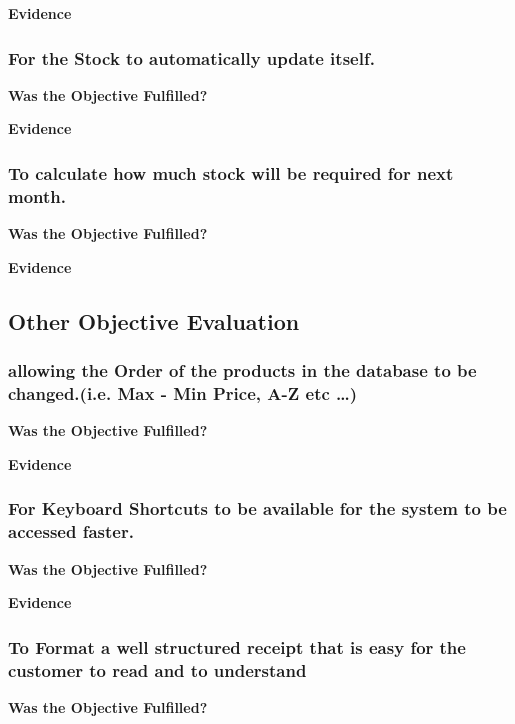 \textbf{Evidence} \newline



\subsubsection{For the Stock to automatically update itself.}
\textbf{Was the Objective Fulfilled?} \newline

\textbf{Evidence} \newline




\subsubsection{To calculate how much stock will be required for next month.}
\textbf{Was the Objective Fulfilled?} \newline

\textbf{Evidence} \newline



\subsection{Other Objective Evaluation}


\subsubsection{allowing the Order of the products in the database to be changed.(i.e. Max - Min Price, A-Z etc \ldots)}
\textbf{Was the Objective Fulfilled?} \newline

\textbf{Evidence} \newline



\subsubsection{For Keyboard Shortcuts to be available for the system to be accessed faster.}
\textbf{Was the Objective Fulfilled?} \newline

\textbf{Evidence} \newline



\subsubsection{To Format a well structured receipt that is easy for the customer to read and to understand}
\textbf{Was the Objective Fulfilled?} \newline

